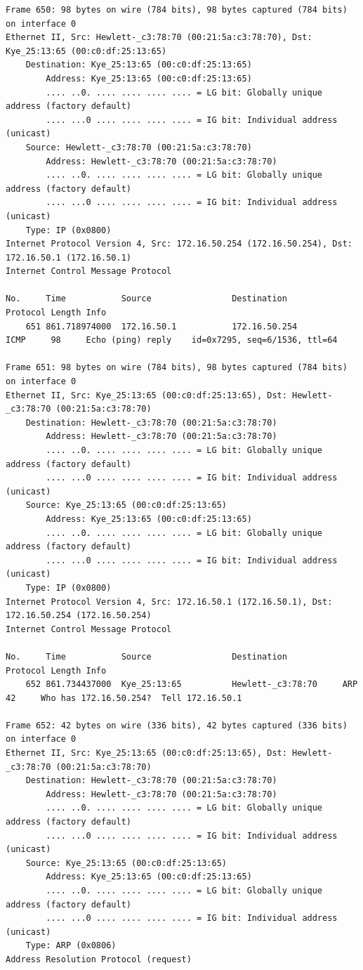 \documentclass[a4paper,11pt]{article}
\begin{document}
\begin{lstlisting}
Frame 650: 98 bytes on wire (784 bits), 98 bytes captured (784 bits) on interface 0
Ethernet II, Src: Hewlett-_c3:78:70 (00:21:5a:c3:78:70), Dst: Kye_25:13:65 (00:c0:df:25:13:65)
    Destination: Kye_25:13:65 (00:c0:df:25:13:65)
        Address: Kye_25:13:65 (00:c0:df:25:13:65)
        .... ..0. .... .... .... .... = LG bit: Globally unique address (factory default)
        .... ...0 .... .... .... .... = IG bit: Individual address (unicast)
    Source: Hewlett-_c3:78:70 (00:21:5a:c3:78:70)
        Address: Hewlett-_c3:78:70 (00:21:5a:c3:78:70)
        .... ..0. .... .... .... .... = LG bit: Globally unique address (factory default)
        .... ...0 .... .... .... .... = IG bit: Individual address (unicast)
    Type: IP (0x0800)
Internet Protocol Version 4, Src: 172.16.50.254 (172.16.50.254), Dst: 172.16.50.1 (172.16.50.1)
Internet Control Message Protocol

No.     Time           Source                Destination           Protocol Length Info
    651 861.718974000  172.16.50.1           172.16.50.254         ICMP     98     Echo (ping) reply    id=0x7295, seq=6/1536, ttl=64

Frame 651: 98 bytes on wire (784 bits), 98 bytes captured (784 bits) on interface 0
Ethernet II, Src: Kye_25:13:65 (00:c0:df:25:13:65), Dst: Hewlett-_c3:78:70 (00:21:5a:c3:78:70)
    Destination: Hewlett-_c3:78:70 (00:21:5a:c3:78:70)
        Address: Hewlett-_c3:78:70 (00:21:5a:c3:78:70)
        .... ..0. .... .... .... .... = LG bit: Globally unique address (factory default)
        .... ...0 .... .... .... .... = IG bit: Individual address (unicast)
    Source: Kye_25:13:65 (00:c0:df:25:13:65)
        Address: Kye_25:13:65 (00:c0:df:25:13:65)
        .... ..0. .... .... .... .... = LG bit: Globally unique address (factory default)
        .... ...0 .... .... .... .... = IG bit: Individual address (unicast)
    Type: IP (0x0800)
Internet Protocol Version 4, Src: 172.16.50.1 (172.16.50.1), Dst: 172.16.50.254 (172.16.50.254)
Internet Control Message Protocol

No.     Time           Source                Destination           Protocol Length Info
    652 861.734437000  Kye_25:13:65          Hewlett-_c3:78:70     ARP      42     Who has 172.16.50.254?  Tell 172.16.50.1

Frame 652: 42 bytes on wire (336 bits), 42 bytes captured (336 bits) on interface 0
Ethernet II, Src: Kye_25:13:65 (00:c0:df:25:13:65), Dst: Hewlett-_c3:78:70 (00:21:5a:c3:78:70)
    Destination: Hewlett-_c3:78:70 (00:21:5a:c3:78:70)
        Address: Hewlett-_c3:78:70 (00:21:5a:c3:78:70)
        .... ..0. .... .... .... .... = LG bit: Globally unique address (factory default)
        .... ...0 .... .... .... .... = IG bit: Individual address (unicast)
    Source: Kye_25:13:65 (00:c0:df:25:13:65)
        Address: Kye_25:13:65 (00:c0:df:25:13:65)
        .... ..0. .... .... .... .... = LG bit: Globally unique address (factory default)
        .... ...0 .... .... .... .... = IG bit: Individual address (unicast)
    Type: ARP (0x0806)
Address Resolution Protocol (request)


\end{lstlisting}
\end{document}
